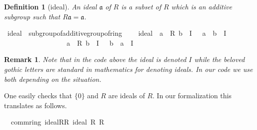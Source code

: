 \documentclass[12pt]{scrartcl}
\newtheorem{definition}[proposition]{Definition}
\newtheorem*{rem}{Remark}
\begin{document}
\begin{definition}[ideal]
	An ideal $\mathfrak{a}$ of $R$ is a subset of $R$ which is an additive subgroup such that $R\mathfrak{a} = \mathfrak{a}$.
\end{definition}


\begin{isabelle}
\isamarkupfalse%
\ ideal\ {\isacharequal}{\kern0pt}\ subgroup{\isacharunderscore}{\kern0pt}of{\isacharunderscore}{\kern0pt}additive{\isacharunderscore}{\kern0pt}group{\isacharunderscore}{\kern0pt}of{\isacharunderscore}{\kern0pt}ring\ {\isacharplus}{\kern0pt}\isanewline
\ \ \ ideal{\isacharcolon}{\kern0pt}\ {\isachardoublequoteopen}{\isasymlbrakk}\ a\ {\isasymin}\ R{\isacharsemicolon}{\kern0pt}\ b\ {\isasymin}\ I\ {\isasymrbrakk}\ {\isasymLongrightarrow}\ a\ {\isasymcdot}\ b\ {\isasymin}\ I{\isachardoublequoteclose}\ \isanewline
\ \ \ \ \ \ \ \ \ \ \ \ \ \ \ \ \ {\isachardoublequoteopen}{\isasymlbrakk}\ a\ {\isasymin}\ R{\isacharsemicolon}{\kern0pt}\ b\ {\isasymin}\ I\ {\isasymrbrakk}\ {\isasymLongrightarrow}\ b\ {\isasymcdot}\ a\ {\isasymin}\ I{\isachardoublequoteclose}
\end{isabelle}

\begin{rem}
	Note that in the code above the ideal is denoted $I$ while the beloved gothic letters are standard in mathematics for denoting ideals. In our code we use both depending on the situation.
\end{rem}	

One easily checks that $\lbrace 0 \rbrace$ and $R$ are ideals of $R$. In our formalization this translates as follows.


\begin{isabelle}
\isamarkupfalse%
\ {\isacharparenleft}{\kern0pt}\ comm{\isacharunderscore}{\kern0pt}ring{\isacharparenright}{\kern0pt}\ ideal{\isacharunderscore}{\kern0pt}R{\isacharunderscore}{\kern0pt}R{\isacharcolon}{\kern0pt}\ {\isachardoublequoteopen}ideal\ R\ R\ {\isacharparenleft}{\kern0pt}{\isacharplus}{\kern0pt}{\isacharparenright}{\kern0pt}\ {\isacharparenleft}{\kern0pt}{\isasymcdot}{\isacharparenright}{\kern0pt}\ {\isasymzero}\ {\isasymone}{\isachardoublequoteclose}
\end{isabelle}
\end{document}
